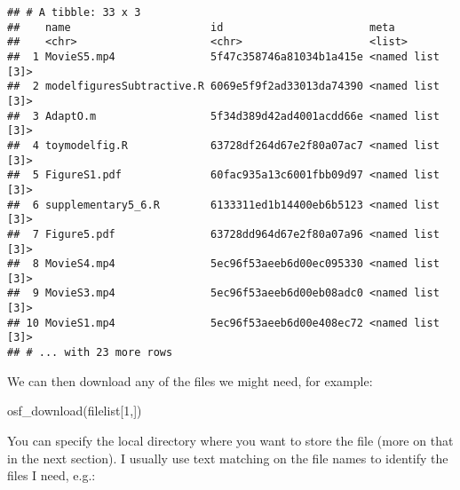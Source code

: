 \documentclass[
]{article}
\newenvironment{Shaded}{\begin{snugshade}}{\end{snugshade}}
\newcommand{\CommentTok}[1]{\textcolor[rgb]{0.56,0.35,0.01}{\textit{#1}}}
\newcommand{\ControlFlowTok}[1]{\textcolor[rgb]{0.13,0.29,0.53}{\textbf{#1}}}
\newcommand{\DecValTok}[1]{\textcolor[rgb]{0.00,0.00,0.81}{#1}}
\newcommand{\FunctionTok}[1]{\textcolor[rgb]{0.00,0.00,0.00}{#1}}
\newcommand{\NormalTok}[1]{#1}
\newcommand{\OtherTok}[1]{\textcolor[rgb]{0.56,0.35,0.01}{#1}}
\newcommand{\SpecialCharTok}[1]{\textcolor[rgb]{0.00,0.00,0.00}{#1}}
\newcommand{\StringTok}[1]{\textcolor[rgb]{0.31,0.60,0.02}{#1}}
\begin{document}
\begin{verbatim}
## # A tibble: 33 x 3
##    name                      id                       meta            
##    <chr>                     <chr>                    <list>          
##  1 MovieS5.mp4               5f47c358746a81034b1a415e <named list [3]>
##  2 modelfiguresSubtractive.R 6069e5f9f2ad33013da74390 <named list [3]>
##  3 AdaptO.m                  5f34d389d42ad4001acdd66e <named list [3]>
##  4 toymodelfig.R             63728df264d67e2f80a07ac7 <named list [3]>
##  5 FigureS1.pdf              60fac935a13c6001fbb09d97 <named list [3]>
##  6 supplementary5_6.R        6133311ed1b14400eb6b5123 <named list [3]>
##  7 Figure5.pdf               63728dd964d67e2f80a07a96 <named list [3]>
##  8 MovieS4.mp4               5ec96f53aeeb6d00ec095330 <named list [3]>
##  9 MovieS3.mp4               5ec96f53aeeb6d00eb08adc0 <named list [3]>
## 10 MovieS1.mp4               5ec96f53aeeb6d00e408ec72 <named list [3]>
## # ... with 23 more rows
\end{verbatim}

We can then download any of the files we might need, for example:

\begin{Shaded}
\begin{Highlighting}[]
\FunctionTok{osf\_download}\NormalTok{(filelist[}\DecValTok{1}\NormalTok{,])}
\end{Highlighting}
\end{Shaded}

You can specify the local directory where you want to store the file (more on that in the next section). I usually use text matching on the file names to identify the files I need, e.g.:

\begin{Shaded}
\end{Shaded}
\end{document}
